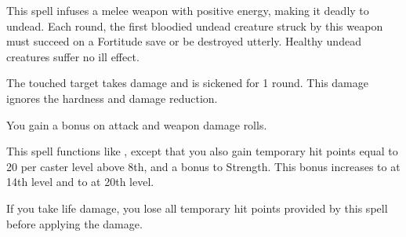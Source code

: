 \spellrng{\rngclose}
\spelldur{\durshort}
\begin{spelleffect}
  This spell infuses a melee weapon with positive energy, making it deadly to undead. Each round, the first bloodied undead creature struck by this weapon must succeed on a Fortitude save or be destroyed utterly. Healthy undead creatures suffer no ill effect.
\end{spelleffect}

\spellrng{\rngtouch}
\begin{spelleffect}
  The touched target takes damage and is sickened for 1 round. This damage ignores the hardness and damage reduction.
\end{spelleffect}

\spellrng{\rngpers}
\spelldur{\durshort}
\begin{spelleffect}
  You gain a  bonus on attack and weapon damage rolls. \bonusscalingdescription
\end{spelleffect}

\begin{spelleffect}
  This spell functions like , except that you also gain temporary hit points equal to 20  per caster level above 8th, and a  bonus to Strength. This bonus increases to  at 14th level and to  at 20th level.

  If you take life damage, you lose all temporary hit points provided by this spell before applying the damage.
\end{spelleffect}

